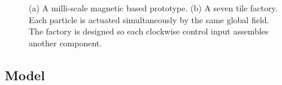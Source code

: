 
\begin{figure}

\centering
{} 
\label{fig:fig1}
\newline
{}
\label{fig:fig2}
\caption{(a) A milli-scale magnetic based prototype.
 (b) A seven tile factory. Each particle is actuated simultaneously by the same global field. The factory is designed so each clockwise control input assembles another component.}
\label{fig:1} 

\end{figure}







 \subsection{Model}\label{subsc:model}
  
